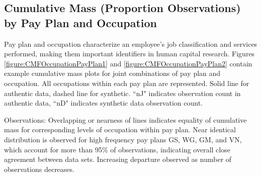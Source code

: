 \documentclass[10pt, letterpaper]{article}
\begin{document}
\begin{spacing}{1.0}
\clearpage

\section{Cumulative Mass (Proportion Observations) by Pay Plan and Occupation}

Pay plan and occupation characterize an employee's job classification and services performed, making them important identifiers in human capital research.  Figures \ref{figure:CMFOccupationPayPlan1} and \ref{figure:CMFOccupationPayPlan2} contain example cumulative mass plots for joint combinations of pay plan and occupation.  All occupations within each pay plan are represented.  Solid line for authentic data, dashed line for synthetic.  ``nJ" indicates observation count in authentic data, ``nD" indicates synthetic data observation count.

Observations:  Overlapping or nearness of lines indicates equality of cumulative mass for corresponding levels of occupation within pay plan.  Near identical distribution is observed for high frequency pay plans GS, WG, GM, and VN, which account for more than 95\% of observations, indicating overall close agreement between data sets.  Increasing departure observed as number of observations decreases.\\


\end{spacing}
\end{document}
